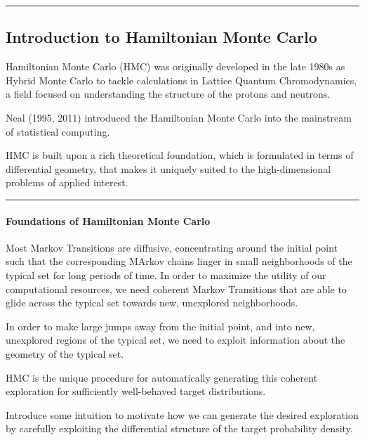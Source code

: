 \documentclass[
]{book}
\begin{document}
\begin{center}\rule{0.5\linewidth}{0.5pt}\end{center}

\hypertarget{introduction-to-hamiltonian-monte-carlo}{%
\subsection{Introduction to Hamiltonian Monte Carlo}\label{introduction-to-hamiltonian-monte-carlo}}

Hamiltonian Monte Carlo (HMC) was originally developed in the late 1980s as Hybrid Monte Carlo to tackle calculations in Lattice Quantum Chromodynamics, a field focused on understanding the structure of the protons and neutrons.

Neal (1995, 2011) introduced the Hamiltonian Monte Carlo into the mainstream of statistical computing.

HMC is built upon a rich theoretical foundation, which is formulated in terms of differential geometry, that makes it uniquely suited to the high-dimensional problems of applied interest.

\begin{center}\rule{0.5\linewidth}{0.5pt}\end{center}

\hypertarget{foundations-of-hamiltonian-monte-carlo}{%
\paragraph{Foundations of Hamiltonian Monte Carlo}\label{foundations-of-hamiltonian-monte-carlo}}

Most Markov Transitions are diffusive, concentrating around the initial point such that the corresponding MArkov chains linger in small neighborhoods of the typical set for long periods of time. In order to maximize the utility of our computational resources, we need coherent Markov Transitions that are able to glide across the typical set towards new, unexplored neighborhoods.

In order to make large jumps away from the initial point, and into new, unexplored regions of the typical set, we need to exploit information about the geometry of the typical set.

HMC is the unique procedure for automatically generating this coherent exploration for sufficiently well-behaved target distributions.

Introduce some intuition to motivate how we can generate the desired exploration by carefully exploiting the differential structure of the target probability density.
\end{document}
